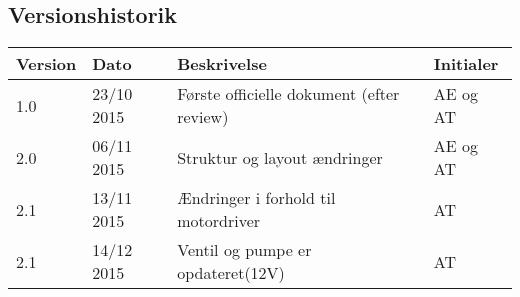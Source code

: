 \subsection{Versionshistorik}

\begin{center}
		\begin{longtable}{ | m{1.5cm} | m{2cm}| m{7.5cm}| m{2cm}| } 
			\hline
			\textbf{Version} & \textbf{Dato} &  \textbf{Beskrivelse} & \textbf{Initialer}  \\ 
			\hline
			1.0  & 23/10 2015 & Første officielle dokument (efter review) & AE og AT \\
			\hline
			2.0  & 06/11 2015 & Struktur og layout ændringer & AE og AT \\
					\hline
			2.1  & 13/11 2015 & Ændringer i forhold til motordriver & AT \\
			\hline
			2.1  & 14/12 2015 & Ventil og pumpe er opdateret(12V)  & AT \\
			\hline
		\end{longtable}	
	\end{center}